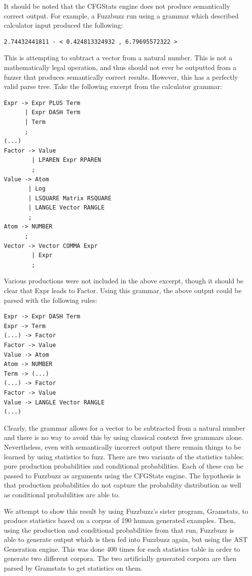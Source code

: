 It should be noted that the CFGStats engine does not produce
semantically correct output. For example, a Fuzzbuzz run using a
grammar which described calculator input produced the following:

\begin{verbatim}
2.74432441811 - < 0.424813324932 , 6.79695572322 >
\end{verbatim}

This is attempting to subtract a vector from a natural number. This is not a
mathematically legal operation, and thus should not ever be outputted from a
fuzzer that produces semantically correct results. However, this has a
perfectly valid parse tree. Take the following excerpt from the calculator
grammar:

\begin{verbatim}
Expr -> Expr PLUS Term
      | Expr DASH Term
      | Term
      ;
(...)
Factor -> Value
        | LPAREN Expr RPAREN
        ;
Value -> Atom
       | Log
       | LSQUARE Matrix RSQUARE
       | LANGLE Vector RANGLE
       ;
Atom -> NUMBER
      ;
Vector -> Vector COMMA Expr
        | Expr
        ;
\end{verbatim}

Various productions were not included in the above excerpt, though it should be
clear that Expr leads to Factor. Using this grammar, the above output could
be parsed with the following rules:

\begin{verbatim}
Expr -> Expr DASH Term
Expr -> Term
(...) -> Factor
Factor -> Value
Value -> Atom
Atom -> NUMBER
Term -> (...)
(...) -> Factor
Factor -> Value
Value -> LANGLE Vector RANGLE
(...)
\end{verbatim}

Clearly, the grammar allows for a vector to be subtracted from a natural number
and there is no way to avoid this by using classical context free grammars
alone. \\


Nevertheless, even with semantically incorrect output there remain things
to be learned by using statistics to fuzz. There are two variants of the
statistics tables: pure production probabilities and conditional probabilities.
Each of these can be passed to Fuzzbuzz as arguments using the CFGStats engine.
The hypothesis is that production probabilities do not capture the probability
distribution as well as conditional probabilities are able to.

We attempt to show this result by using Fuzzbuzz's sister program, Gramstats,
to produce statistics based on a corpus of 190 human generated examples. Then,
using the production and conditional probabilities from that run, Fuzzbuzz is
able to generate output which is then fed into Fuzzbuzz again, but using the AST
Generation engine. This was done 400 times for each statistics table in order to
generate two different corpora. The two artificially generated corpora are then
parsed by Gramstats to get statistics on them.

